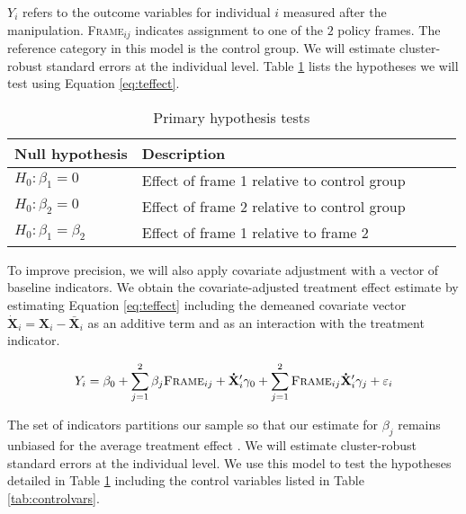\documentclass[11pt, a4paper]{article}\usepackage[]{graphicx}\usepackage[]{color}
\begin{document}
        $Y_{i}$ refers to the outcome variables for individual $i$ measured after the manipulation. \textsc{Frame}$_{ij}$ indicates assignment to one of the $2$ policy frames. The reference category in this model is the control group. We will estimate cluster-robust standard errors at the individual level. Table \ref{tab:hypotheses} lists the hypotheses we will test using Equation \ref{eq:teffect}.

        \begin{table}[h]
        \centering
        \caption{Primary hypothesis tests}
        \label{tab:hypotheses}
        \begin{tabular}{@{}lllll@{}}
        \toprule
        Null hypothesis                                     & Description                                          &  &  &  \\ \midrule
        $H_0: \beta_1 = 0$ & Effect of frame 1 relative to control group&  &  &  \\
        $H_0: \beta_2 = 0$ & Effect of frame 2 relative to control group&  &  &  \\
        $H_0: \beta_1 = \beta_2$ & Effect of frame 1 relative to frame 2 &  &  &  \\ \bottomrule
        \end{tabular}
        \end{table}

        To improve precision, we will also apply covariate adjustment with a vector of baseline indicators. We obtain the covariate-adjusted treatment effect estimate by estimating Equation \ref{eq:teffect} including the demeaned covariate vector $\mathbf{\dot X}_{i} = \mathbf{X}_{i} - \mathbf{\bar X}_{i}$ as an additive term and as an interaction with the treatment indicator.

        \begin{equation} \label{eq:controls}
            Y_{i} = \beta_{0} + \sum_{j=1}^{2} \beta_{j}\text{\textsc{Frame}}_{ij} + \mathbf{\dot X}'_i \gamma_{0} + \sum_{j=1}^{2} \text{\textsc{Frame}}_{ij} \mathbf{\dot X}'_i \gamma_{j} + \varepsilon_{i}
        \end{equation}

        The set of indicators partitions our sample so that our estimate for $\beta_j$ remains unbiased for the average treatment effect \parencite{lin_agnostic_2013}. We will estimate cluster-robust standard errors at the individual level. We use this model to test the hypotheses detailed in Table \ref{tab:hypotheses} including the control variables listed in Table \ref{tab:controlvars}.
\end{document}
